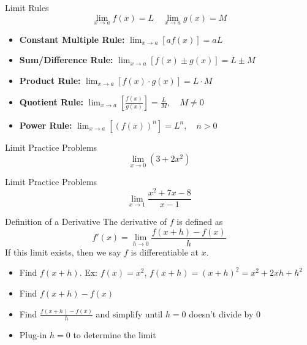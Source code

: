 \documentclass[aspectratio=169]{beamer}
\begin{document}
\begin{frame}{Limit Rules}\label{main1}
    \[
    \lim_{x \to a} f(x) = L \quad \lim_{x \to a} g(x) = M
    \]
    \vspace{1em}
    \begin{itemize}
        \item \textbf{Constant Multiple Rule:} \quad $\lim_{x \to a} [a f(x)] = a L$
        \item \textbf{Sum/Difference Rule:} \quad $\lim_{x \to a} [f(x) \pm g(x)] = L \pm M$
        \item \textbf{Product Rule:} \quad $\lim_{x \to a} [f(x) \cdot g(x)] = L \cdot M$
        \item \textbf{Quotient Rule:} \quad $\lim_{x \to a} \left[ \frac{f(x)}{g(x)} \right] = \frac{L}{M}, \quad M \neq 0$
        \item \textbf{Power Rule:} \quad $\lim_{x \to a} [(f(x))^n] = L^n, \quad n > 0$
    \end{itemize}
\end{frame}

\begin{frame}{Limit Practice Problems}\label{main1}
    \vspace{-4cm}
    \[
    \lim_{x \to 0} (3 + 2x^{2})
    \]
\end{frame}

\begin{frame}{Limit Practice Problems}\label{main1}
	\vspace{-4cm}
    \[
    \lim_{x \to 1} \frac{x^{2} + 7x - 8}{x - 1} 
    \]
\end{frame}

\begin{frame}{Definition of a Derivative}\label{main1}
The derivative of \(f\) is defined as
\[
f'(x) = \lim_{h \to 0} \frac{f(x + h) - f(x)}{h}
\]
If this limit exists, then we say \(f\) is differentiable at \(x\).
\begin{itemize}
	\begin{itemize}
    \item Find \(f(x + h)\). Ex: \(f(x) = x^2\), \(f(x + h) = (x + h)^2 = x^2 + 2xh + h^2\)
    \item Find \(f(x + h) - f(x)\)
    \item Find \(\frac{f(x + h) - f(x)}{h}\) and simplify until \(h = 0\) doesn’t divide by 0
    \item Plug-in \(h = 0\) to determine the limit
    \end{itemize}
\end{itemize}
\end{frame}
\end{document}
